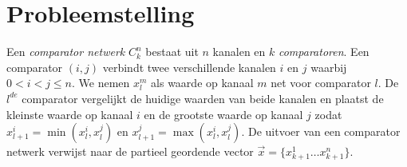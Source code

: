 \documentclass{article}
\begin{document}
\section{Probleemstelling}
Een \textit{comparator netwerk} $C^n_k$ bestaat uit $n$ kanalen en $k$ \textit{comparatoren}.
Een comparator $\left(i, j\right)$ verbindt twee verschillende kanalen $i$ en $j$ waarbij $0 < i < j \leq n$.
We nemen $x_l^m$ als waarde op kanaal $m$ net voor comparator $l$.
De $l^{de}$ comparator  vergelijkt de huidige waarden van beide kanalen en plaatst de kleinste waarde op kanaal $i$ en de grootste waarde op kanaal $j$ zodat $x_{l+1}^i = \min(x_l^i,x_l^j)$ en $x_{l+1}^j = \max(x_l^i,x_l^j)$.
De uitvoer van een comparator netwerk verwijst naar de partieel geordende vector $\vec{x} = \{x^1_{k+1} \dots x^n_{k+1} \} $. %
\end{document}
